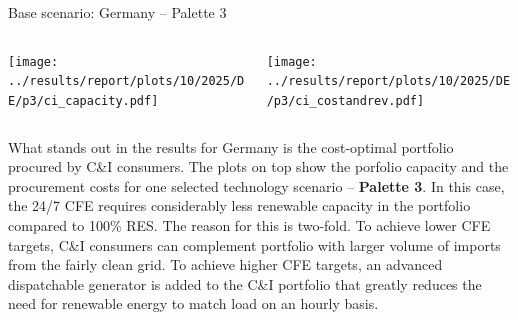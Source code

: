 \begin{frame}{Base scenario: Germany -- Palette 3}

    {\footnotesize
  
    \begin{columns}
    \begin{column}{7cm}
    \centering
    \texttt{[image: ../results/report/plots/10/2025/DE/p3/ci\_capacity.pdf]}
    \end{column}
  
    \begin{column}{8cm}
    \centering
    \texttt{[image: ../results/report/plots/10/2025/DE/p3/ci\_costandrev.pdf]}
    \end{column}
  
    \end{columns}
  
    \begin{columns}
    \begin{column}{15cm}
     
    What stands out in the results for Germany is the cost-optimal 
    portfolio procured by C\&I consumers. 
    The plots on top show the porfolio capacity and the procurement 
    costs for one selected technology scenario -- {\bf Palette 3}.
    In this case, the 24/7 CFE requires
    \alert{considerably less renewable capacity} in the portfolio 
    compared to 100\% RES. The reason for this is two-fold. 
    To achieve lower CFE targets, C\&I consumers can complement portfolio with larger volume of 
    imports from the fairly clean grid. 
    To achieve higher CFE targets, an \alert{advanced dispatchable generator}
    is added to the C\&I portfolio that greatly reduces the need 
    for renewable energy to match load on an hourly basis.
    \end{column}
    \end{columns}
    }
  
  \end{frame}



